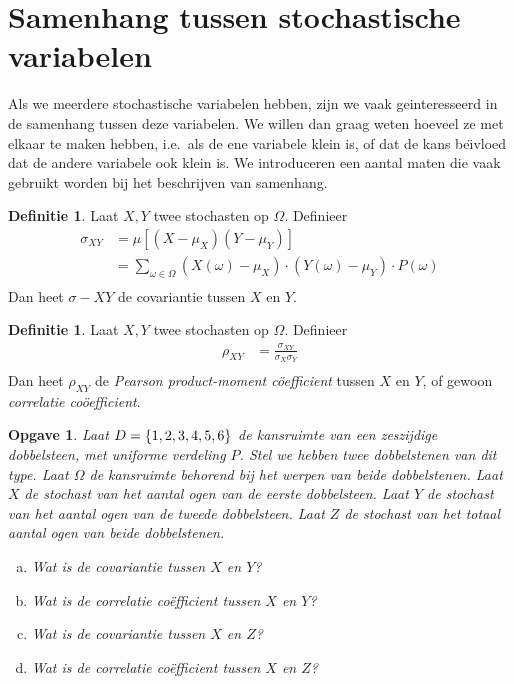 \documentclass[a4paper]{book}
\newtheorem{exercise}[theorem]{Opgave}
\theoremstyle{definition}
\newtheorem{definition}[theorem]{Definitie}
\begin{document}
\section{Samenhang tussen stochastische variabelen}
Als we meerdere stochastische variabelen hebben, zijn we vaak geinteresseerd in de samenhang tussen deze variabelen.
We willen dan graag weten hoeveel ze met elkaar te maken hebben, i.e.\ als de ene variabele klein is, of dat de kans be\"{\i}vloed dat de andere
variabele ook klein is. We introduceren een aantal maten die vaak gebruikt worden bij het beschrijven van samenhang.

\begin{definition}
    Laat $X,Y$ twee stochasten op $\Omega$.
    Definieer
    \begin{align*}
        \sigma_{XY} &= \mu[ (X - \mu_X)(Y - \mu_Y) ] \\
                    &= \sum_{\omega \in \Omega} (X(\omega) - \mu_X) \cdot (Y(\omega) - \mu_Y) \cdot P(\omega) \\
    \end{align*}
    Dan heet $\sigma-{XY}$ de covariantie tussen $X$ en $Y$.
\end{definition}

\begin{definition}
    Laat $X,Y$ twee stochasten op $\Omega$.
    Definieer
    \begin{align*}
        \rho_{XY} &= \frac{\sigma_{XY}}{\sigma_X \sigma_Y} \\
    \end{align*}
    Dan heet $\rho_{XY}$ de \emph{Pearson product-moment c\"oefficient} tussen $X$ en $Y$, of gewoon \emph{correlatie co\"oefficient}.
\end{definition}

\begin{exercise}
    Laat $D = \set{1,2,3,4,5,6}$ de kansruimte van een zeszijdige dobbelsteen, met uniforme verdeling $P$.
    Stel we hebben twee dobbelstenen van dit type. Laat $\Omega$ de kansruimte behorend bij het werpen van beide dobbelstenen.
    Laat $X$ de stochast van het aantal ogen van de eerste dobbelsteen.
    Laat $Y$ de stochast van het aantal ogen van de tweede dobbelsteen.
    Laat $Z$ de stochast van het totaal aantal ogen van beide dobbelstenen.
    \begin{enumerate}[a.]
    \item Wat is de covariantie tussen $X$ en $Y$?
    \item Wat is de correlatie co\"efficient tussen $X$ en $Y$?
    \item Wat is de covariantie tussen $X$ en $Z$?
    \item Wat is de correlatie co\"efficient tussen $X$ en $Z$?
    \end{enumerate}
\end{exercise}
\end{document}
